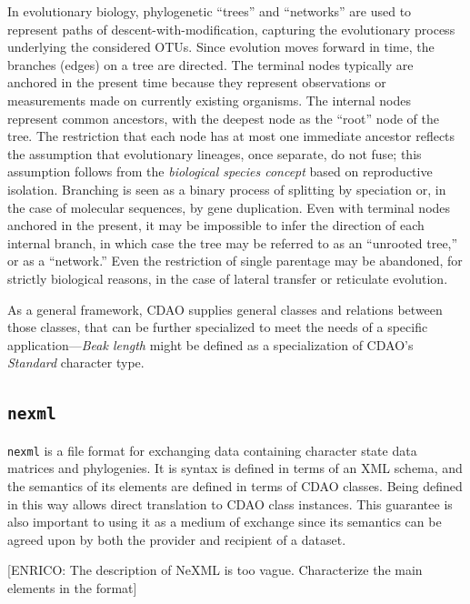 \documentclass[10pt]{bmc_article}
\newenvironment{bmcformat}{\fussy\setboolean{publ}{true}}{\fussy}
\begin{document}
\begin{bmcformat}
In evolutionary biology, phylogenetic ``trees'' and ``networks'' are
used to represent paths of descent-with-modification, capturing the
evolutionary process underlying the considered OTUs. Since evolution moves
forward in time, the branches (edges) on a tree are directed. The
terminal nodes typically are anchored in the present time because
they represent observations or measurements made on currently
existing organisms. The internal nodes represent common
ancestors, with the deepest node as the ``root'' node of the tree.
The restriction that each node has at most one immediate ancestor
reflects the assumption that evolutionary lineages, once separate,
do not fuse; this assumption follows from the \emph{biological species
concept} based on reproductive isolation. Branching is seen as a
binary process of splitting by speciation or, in the case of
molecular sequences, by gene duplication. 
Even with terminal nodes anchored in the present, it may be
impossible to infer the direction of each internal branch, in which
case the tree may be referred to as an ``unrooted tree,'' or as a
``network.'' Even the restriction of single parentage may be
abandoned, for strictly biological reasons, in the case of lateral
transfer or reticulate evolution. 
  
  As a general framework, CDAO supplies general classes and relations between those classes, 
  that can be further specialized to meet the needs of a specific application---\emph{Beak length}
   might be defined as a specialization of CDAO's \textit{Standard} 
  character type.
   

\subsection*{\tt nexml}
  {\tt nexml} \cite{nexml} is a file format for exchanging data containing character state data
  matrices and phylogenies. It is syntax is defined in terms of an XML schema, and the semantics of its elements
  are defined in terms of CDAO classes. Being defined in this way allows direct translation to CDAO class instances.
  This guarantee is also important to using it as a medium of exchange since its semantics can be agreed upon by
  both the provider and recipient of a dataset.
  
  [ENRICO: The description of NeXML is too vague. Characterize the main elements in the format]


\end{bmcformat}
\end{document}
